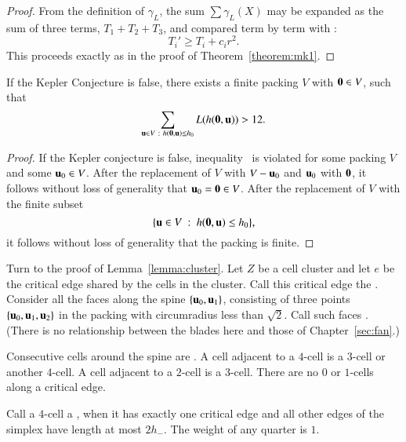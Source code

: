 \begin{proof}
From the definition of $\gamma_L$, the sum $\sum \gamma_L(X)$ may be expanded as the sum of three terms, $T_1+T_2+T_3$, and compared term by term with :
\begin{displaymath}
T_i' \ge T_i + c_i r^2.
\end{displaymath}
This proceeds exactly as in the proof of Theorem~\ref{theorem:mk1}.
\end{proof}

\begin{corollary}\label{cor:CE} If the Kepler Conjecture is false,
there exists a finite packing $ V$ with ${\mathbf 0}\in V$, such
that
\begin{equation}\label{eqn:CE}
\sum_{ {\mathbf u}\in V \ :\  h({\mathbf 0}, {\mathbf u})\le h_0} L(h({\mathbf 0}, {\mathbf u})) > 12.
\end{equation}
\end{corollary}

\begin{proof} If the Kepler conjecture is false, inequality~ is violated for some packing $ V$ and some $ {\mathbf u}_0\in V$.  After the replacement of $ V$ with $ V -  {\mathbf u}_0$ and $ {\mathbf u}_0$ with ${\mathbf 0}$, it follows without loss of generality that $ {\mathbf u}_0={\mathbf 0}\in V$.  After the replacement of $ V$ with the finite subset
\begin{displaymath}
\{ {\mathbf u}\in V\ :\  h({\mathbf 0}, {\mathbf u})\le h_0\},
\end{displaymath}
it follows without loss of generality that the packing is finite.
\end{proof}


Turn to the proof of Lemma~\ref{lemma:cluster}.   Let $Z$ be a cell cluster and let $e$ be the  critical edge shared by the cells in the cluster.   Call this critical edge the .  Consider all the faces along the spine $\{ {\mathbf u}_0, {\mathbf u}_1\}$, consisting of three points $\{ {\mathbf u}_0, {\mathbf u}_1, {\mathbf u}_2\}$ in the packing with circumradius less than $\sqrt2$.  Call such faces .  (There is no relationship between the blades here and those of Chapter~\ref{sec:fan}.)
%
%
%

Consecutive cells around the spine are .
A cell adjacent to a $4$-cell is a $3$-cell or another $4$-cell.  A cell adjacent to a $2$-cell is a $3$-cell.  There are no $0$ or $1$-cells along a critical edge.
%
%

Call a $4$-cell a , when it has exactly one critical edge and all other edges of the simplex have length at most $2 h_-$.  The weight of any quarter is $1$.





